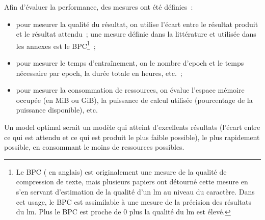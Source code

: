 Afin d'évaluer la performance, des mesures ont été définies~:
\begin{itemize}
	\item pour mesurer la qualité du résultat, on utilise l'écart entre le résultat produit et le résultat attendu~; une mesure définie dans la littérature et utilisée dans les annexes est le BPC\footnote{Le BPC ( en anglais) \autocite{BPC} est originalement une mesure de la qualité de compression de texte, mais plusieurs papiers ont détourné cette mesure en s'en servant d'estimation de la qualité d'un \gls{lm} au niveau du caractère. Dans cet usage, le BPC est assimilable à une mesure de la précision des résultats du \gls{lm}. Plus le BPC est proche de 0 plus la qualité du \gls{lm} est élevé.}~;
	\item pour mesurer le temps d'entraînement, on le nombre d'\gls{epoch} et le temps nécessaire par \gls{epoch}, la durée totale en heures, etc.~;
	\item pour mesurer la consommation de ressources, on évalue l'espace mémoire occupée (en MiB ou GiB), la puissance de calcul utilisée (pourcentage de la puissance disponible), etc.
\end{itemize}
\vspace{1em}

Un \gls{model} optimal serait un modèle qui atteint d'excellents résultats  (l'écart entre ce qui est attendu et ce qui est produit le plus faible possible), le plus rapidement possible, en consommant le moins de ressources possibles.

